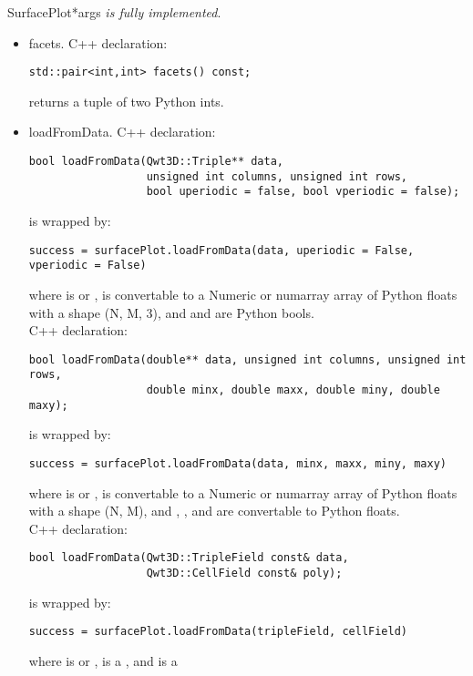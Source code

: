 \documentclass{manual}
\begin{document}
\begin{classdesc}{SurfacePlot}{*args}
  \emph{is fully implemented}.
  \begin{itemize}
  \item{facets}. C++ declaration:
\begin{verbatim}
std::pair<int,int> facets() const;
\end{verbatim}
    returns a tuple of two Python ints.
  \item{loadFromData}. C++ declaration:
\begin{verbatim}
bool loadFromData(Qwt3D::Triple** data,
                  unsigned int columns, unsigned int rows,
                  bool uperiodic = false, bool vperiodic = false);
\end{verbatim}
    is wrapped by:
\begin{verbatim}
success = surfacePlot.loadFromData(data, uperiodic = False, vperiodic = False)
\end{verbatim}
    where  is  or , 
    is convertable to a Numeric or numarray array of Python floats with a shape
    (N, M, 3), and  and  are Python bools.\\
    C++ declaration:
\begin{verbatim}
bool loadFromData(double** data, unsigned int columns, unsigned int rows,
                  double minx, double maxx, double miny, double maxy);
\end{verbatim}
    is wrapped by:
\begin{verbatim}
success = surfacePlot.loadFromData(data, minx, maxx, miny, maxy)
\end{verbatim}
    where  is  or , 
    is convertable to a Numeric or numarray array of Python floats with a shape
    (N, M), and , ,  and  are
    convertable to Python floats.\\
    C++ declaration:
\begin{verbatim}
bool loadFromData(Qwt3D::TripleField const& data,
                  Qwt3D::CellField const& poly);
\end{verbatim}
    is wrapped by:
\begin{verbatim}
success = surfacePlot.loadFromData(tripleField, cellField)
\end{verbatim}
    where  is  or ,
     is a , and  is a

\end{itemize}
\end{classdesc}
\end{document}
